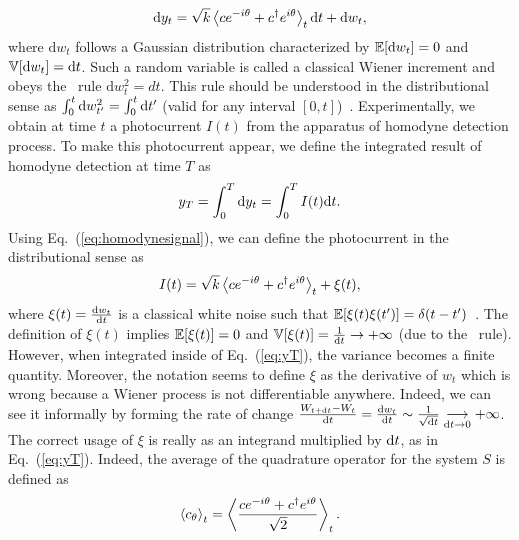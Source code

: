 \begin{equation}\label{eq:homodynesignal}
    \mathrm{d}y_t = \sqrt{k}\expval{ce^{-i\theta}+c^\dagger e^{i\theta}}_t\mathrm{d}t + \mathrm{d}w_t,    
\end{equation}
where $\mathrm{d}w_t$ follows a Gaussian distribution characterized by $\mathbb{E}\qty[\mathrm{d}w_t]=0$ and $\mathbb{V}\qty[\mathrm{d}w_t]=\mathrm{d}t$. Such a random variable is called a classical Wiener increment and obeys the \ito~rule $\mathrm{d}w_t^2=dt$. This rule should be understood in the distributional sense as $\int_0^t\mathrm{d}w_{t'}^2=\int_0^t\mathrm{d}t'$ (valid for any interval $[0,t]$)~\cite{Jacobs2006}. Experimentally, we obtain at time $t$ a photocurrent $I(t)$ from the apparatus of homodyne detection process. To make this photocurrent appear, we define the integrated result of homodyne detection at time $T$ as
\begin{equation}\label{eq:yT}
    y_T = \int_0^T\mathrm{d}y_t = \int_0^T I(t)\mathrm{d}t.
\end{equation}
Using Eq.~(\ref{eq:homodynesignal}), we can define the photocurrent in the distributional sense as
\begin{equation}
    I(t) = \sqrt{k}\expval{ce^{-i\theta}+c^\dagger e^{i\theta}}_t+\xi(t),
\end{equation}
where $\xi(t)=\frac{\mathrm{d}w_t}{\mathrm{d}t}$ is a classical white noise such that $\mathbb{E}\qty[\xi(t)\xi(t')]=\delta(t-t')$~\cite{Albarelli}. The definition of $\xi(t)$ implies $\mathbb{E}\qty[\xi(t)]=0$ and $\mathbb{V}\qty[\xi(t)]=\frac{1}{\mathrm{d}t}\rightarrow +\infty$ (due to the \ito~rule). However, when integrated inside of Eq.~(\ref{eq:yT}), the variance becomes a finite quantity. Moreover, the notation seems to define $\xi$ as the derivative of $w_t$ which is wrong because a Wiener process is not differentiable anywhere. Indeed, we can see it informally by forming the rate of change $\frac{W_{t+\mathrm{d}t}-W_t}{\mathrm{d}t}=\frac{\mathrm{d}w_t}{\mathrm{d}t}\sim\frac{1}{\sqrt{\mathrm{d}t}}\underset{\mathrm{d}t\rightarrow 0}{\longrightarrow}+\infty$. The correct usage of $\xi$ is really as an integrand multiplied by $\mathrm{d}t$, as in Eq.~(\ref{eq:yT}).
 Indeed, the average of the quadrature operator for the system $S$ is defined as
\begin{equation}
    \expval{c_\theta}_t = \expval{\frac{ce^{-i\theta}+c^\dagger e^{i\theta}}{\sqrt{2}}}_t.
\end{equation}

